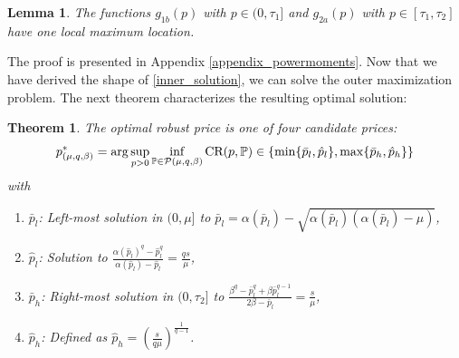 \documentclass[11pt]{article}
\newtheorem{theorem}{Theorem}[section]
\newtheorem{lemma}{Lemma}[section]
\newcommand{\bP}{\mathbb{P}}
\newcommand{\cP}{\mathcal{P}}
\newcommand{\1}{\mathds{1}}
\begin{document}
\begin{lemma}\label{lemma:ulm}
    The functions $g_{1b}(p)$ with $p \in (0,\tau_1]$ and $g_{2a}(p)$ with $p \in [\tau_1,\tau_2]$ have one local maximum location.
\end{lemma}
\noindent The proof is presented in Appendix \ref{appendix_powermoments}. Now that we have derived the shape of \eqref{inner_solution}, we can solve the outer maximization problem. The next theorem characterizes the resulting optimal solution:
\begin{theorem}\label{th:optimal_price_q}
    The optimal robust price is one of four candidate prices: $$p_{(\mu,q,\beta)}^*=\arg\sup_{p>0}\inf_{\bP\in\cP(\mu,q,\beta)}\textup{CR}(p,\bP)\in \{\min\{\bar{p}_l,\hat{p}_l\},\max\{\bar{p}_h,\hat{p}_h\}\}$$
with
\begin{enumerate}[label=\textup{(\roman*)}]
\item $\bar{p}_l$: Left-most solution in $(0,\mu]$ to $\bar{p}_l = \alpha(\bar{p}_l) - \sqrt{\alpha(\bar{p}_l)(\alpha(\bar{p}_l) - \mu)}$,
\item $\hat{p}_l$: Solution to $\frac{\alpha(\hat{p}_l)^q - \hat{p}_l^q}{\alpha(\hat{p}_l) - \hat{p}_l} = \frac{qs}{\mu}$,
\item $\bar{p}_h$: Right-most solution in $(0,\tau_2]$ to $\frac{\beta^q - \bar{p}_l^q + \beta \bar{p}_l^{q-1}}{2\beta - \bar{p}_l} = \frac{s}{\mu}$,
\item $\hat{p}_h$: Defined as $\hat{p}_h = \left(\frac{s}{q\mu}\right)^{\frac{1}{q-1}}$.
\end{enumerate}
\end{theorem}
\end{document}
